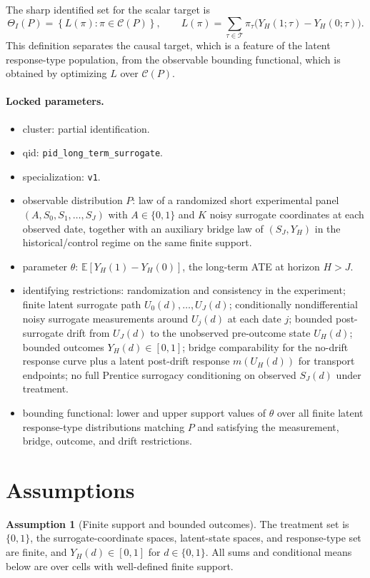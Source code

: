 \documentclass[11pt]{article}
\newcommand{\E}{\mathbb{E}}
\theoremstyle{definition}
\newtheorem{assumption}{Assumption}
\theoremstyle{plain}
\theoremstyle{remark}
\begin{document}
The sharp identified set for the scalar target is
\[
  \Theta_I(P)
  =
  \left\{
    L(\pi):\pi\in\mathcal C(P)
  \right\},
  \qquad
  L(\pi)=
  \sum_{\tau\in\mathcal T}\pi_\tau
  \bigl(Y_H(1;\tau)-Y_H(0;\tau)\bigr).
\]
This definition separates the causal target, which is a feature of the latent response-type population, from the observable bounding functional, which is obtained by optimizing \(L\) over \(\mathcal C(P)\).

\paragraph{Locked parameters.}
\begin{itemize}[leftmargin=*]
  \item cluster: partial identification.
  \item qid: \texttt{pid\_long\_term\_surrogate}.
  \item specialization: \texttt{v1}.
  \item observable distribution \(P\): law of a randomized short experimental panel
  \((A,S_0,S_1,\ldots,S_J)\) with \(A\in\{0,1\}\) and \(K\) noisy surrogate coordinates
  at each observed date, together with an auxiliary bridge law of
  \((S_J,Y_H)\) in the historical/control regime on the same finite support.
  \item parameter \(\theta\): \(\E[Y_H(1)-Y_H(0)]\), the long-term ATE at horizon \(H>J\).
  \item identifying restrictions: randomization and consistency in the experiment;
  finite latent surrogate path \(U_0(d),\ldots,U_J(d)\); conditionally
  nondifferential noisy surrogate measurements around \(U_j(d)\) at each date \(j\);
  bounded post-surrogate drift from \(U_J(d)\) to the
  unobserved pre-outcome state \(U_H(d)\); bounded outcomes \(Y_H(d)\in[0,1]\);
  bridge comparability for the no-drift response curve plus a latent
  post-drift response \(m(U_H(d))\) for transport endpoints; no full
  Prentice surrogacy conditioning on observed \(S_J(d)\) under treatment.
  \item bounding functional: lower and upper support values of \(\theta\) over all finite
  latent response-type distributions matching \(P\) and satisfying the
  measurement, bridge, outcome, and drift restrictions.
\end{itemize}

\section{Assumptions}
\begin{assumption}[Finite support and bounded outcomes]\label{ass:finite}
The treatment set is \(\{0,1\}\), the surrogate-coordinate spaces, latent-state spaces, and response-type set are finite, and \(Y_H(d)\in[0,1]\) for \(d\in\{0,1\}\).  All sums and conditional means below are over cells with well-defined finite support.
\end{assumption}
\end{document}
